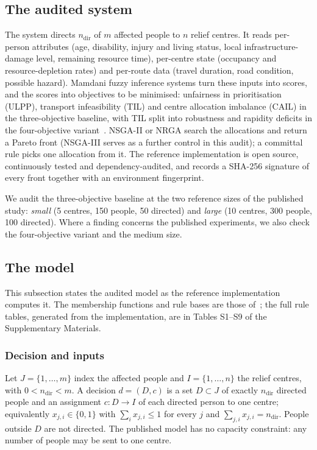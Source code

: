 \documentclass[systems,article,submit,moreauthors,pdftex]{Definitions/mdpi}
\begin{document}
\subsection{The audited system}
The system directs $n_{\mathrm{dir}}$ of $m$ affected people to $n$ relief centres. It
reads per-person attributes (age, disability, injury and living status, local
infrastructure-damage level, remaining resource time), per-centre state (occupancy and
resource-depletion rates) and per-route data (travel duration, road condition, possible
hazard). Mamdani fuzzy inference systems turn these inputs into scores, and the scores
into objectives to be minimised: unfairness in prioritisation (ULPP), transport
infeasibility (TIL) and centre allocation imbalance (CAIL) in the three-objective
baseline, with TIL split into robustness and rapidity deficits in the four-objective
variant~\cite{rabiei2026resilient}. NSGA-II or NRGA search the allocations and return a
Pareto front (NSGA-III serves as a further control in this audit); a committal rule picks one allocation from it. The reference
implementation is open source, continuously tested and dependency-audited, and records a
SHA-256 signature of every front together with an environment fingerprint.

We audit the three-objective baseline at the two reference sizes of the published study:
\emph{small} (5 centres, 150 people, 50 directed) and \emph{large} (10 centres, 300
people, 100 directed). Where a finding concerns the published experiments, we also check
the four-objective variant and the medium size.

\subsection{The model}\label{sec:model}
This subsection states the audited model as the reference implementation computes it. The
membership functions and rule bases are those of~\cite{rabiei2026resilient}; the full rule
tables, generated from the implementation, are in Tables S1--S9 of the Supplementary Materials.

\subsubsection{Decision and inputs}
Let $J=\{1,\dots,m\}$ index the affected people and $I=\{1,\dots,n\}$ the relief centres, with
$0<n_{\mathrm{dir}}<m$. A decision $d=(D,c)$ is a set $D\subset J$ of exactly $n_{\mathrm{dir}}$
directed people and an assignment $c\colon D\to I$ of each directed person to one centre;
equivalently $x_{j,i}\in\{0,1\}$ with $\sum_{i}x_{j,i}\le 1$ for every $j$ and
$\sum_{j,i}x_{j,i}=n_{\mathrm{dir}}$. People outside $D$ are not directed. The published model
has no capacity constraint: any number of people may be sent to one centre.
\end{document}
